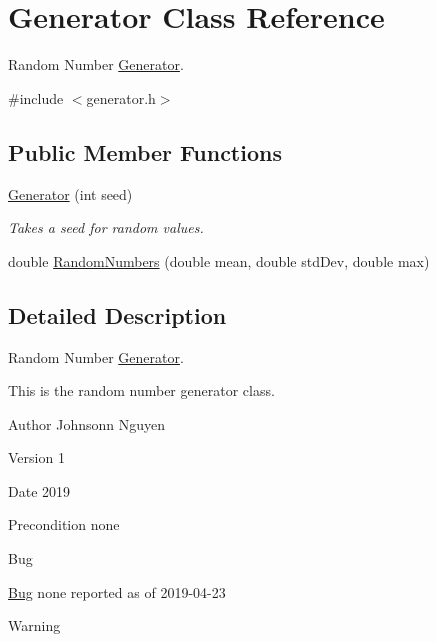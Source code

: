 \hypertarget{classGenerator}{}\section{Generator Class Reference}
\label{classGenerator}


Random Number \hyperlink{classGenerator}{Generator}.  




{\ttfamily \#include $<$generator.\+h$>$}

\subsection*{Public Member Functions}
\begin{DoxyCompactItemize}
\item 
\hyperlink{classGenerator_a14b6bb40fe312824f6ab882336fa53ac}{Generator} (int seed)\hypertarget{classGenerator_a14b6bb40fe312824f6ab882336fa53ac}{}\label{classGenerator_a14b6bb40fe312824f6ab882336fa53ac}

\begin{DoxyCompactList}\small\item\em Takes a seed for random values. \end{DoxyCompactList}\item 
double \hyperlink{classGenerator_a6d2596bcce1864d629484739acddde9f}{Random\+Numbers} (double mean, double std\+Dev, double max)
\end{DoxyCompactItemize}


\subsection{Detailed Description}
Random Number \hyperlink{classGenerator}{Generator}. 

This is the random number generator class.~\newline
\begin{DoxyAuthor}{Author}
Johnsonn Nguyen 
\end{DoxyAuthor}
\begin{DoxyVersion}{Version}
1 
\end{DoxyVersion}
\begin{DoxyDate}{Date}
2019 
\end{DoxyDate}
\begin{DoxyPrecond}{Precondition}
none 
\end{DoxyPrecond}
\begin{DoxyRefDesc}{Bug}
\item[\hyperlink{bug__bug000001}{Bug}]none reported as of 2019-\/04-\/23 \end{DoxyRefDesc}
\begin{DoxyWarning}{Warning}

\end{DoxyWarning}


